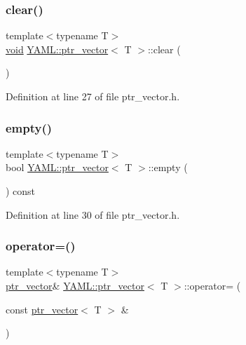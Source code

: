 \subsubsection{\texorpdfstring{clear()}{clear()}}
{\footnotesize\ttfamily template$<$typename T$>$ \\
\mbox{\hyperlink{glad_8h_a950fc91edb4504f62f1c577bf4727c29}{void}} \mbox{\hyperlink{class_y_a_m_l_1_1ptr__vector}{Y\+A\+M\+L\+::ptr\+\_\+vector}}$<$ T $>$\+::clear (\begin{DoxyParamCaption}{ }\end{DoxyParamCaption})\hspace{0.3cm}{\ttfamily [inline]}}



Definition at line 27 of file ptr\+\_\+vector.\+h.

\mbox{\label{class_y_a_m_l_1_1ptr__vector_a9ee7d7961a73ce06dcfa08f3e02a25ee}} 
\subsubsection{\texorpdfstring{empty()}{empty()}}
{\footnotesize\ttfamily template$<$typename T$>$ \\
bool \mbox{\hyperlink{class_y_a_m_l_1_1ptr__vector}{Y\+A\+M\+L\+::ptr\+\_\+vector}}$<$ T $>$\+::empty (\begin{DoxyParamCaption}{ }\end{DoxyParamCaption}) const\hspace{0.3cm}{\ttfamily [inline]}}



Definition at line 30 of file ptr\+\_\+vector.\+h.

\mbox{\label{class_y_a_m_l_1_1ptr__vector_a2d14a364d345f9eda55eb7c39fd98918}} 
\subsubsection{\texorpdfstring{operator=()}{operator=()}\hspace{0.1cm}{\footnotesize\ttfamily [1/2]}}
{\footnotesize\ttfamily template$<$typename T$>$ \\
\mbox{\hyperlink{class_y_a_m_l_1_1ptr__vector}{ptr\+\_\+vector}}\& \mbox{\hyperlink{class_y_a_m_l_1_1ptr__vector}{Y\+A\+M\+L\+::ptr\+\_\+vector}}$<$ T $>$\+::operator= (\begin{DoxyParamCaption}\item[{const \mbox{\hyperlink{class_y_a_m_l_1_1ptr__vector}{ptr\+\_\+vector}}$<$ T $>$ \&}]{ }\end{DoxyParamCaption})\hspace{0.3cm}{\ttfamily [delete]}}

